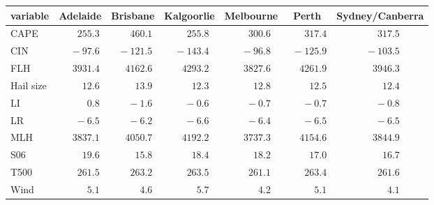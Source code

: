 \begin{tabular}{lcccccc}
\hline
variable  & Adelaide & Brisbane & Kalgoorlie & Melbourne & Perth & \multicolumn{1}{c}{Sydney/Canberra} \\ 
\hline
CAPE  & $\phantom{0}\phantom{-}255.3$ & $\phantom{0}\phantom{-}460.1$ & $\phantom{0}\phantom{-}255.8$ & $\phantom{0}\phantom{-}300.6$ & $\phantom{0}\phantom{-}317.4$ & $\phantom{0}\phantom{-}317.5$ \\
CIN  & $\phantom{00}-97.6$ & $\phantom{0}-121.5$ & $\phantom{0}-143.4$ & $\phantom{00}-96.8$ & $\phantom{0}-125.9$ & $\phantom{0}-103.5$ \\
FLH  & $\phantom{-}3931.4$ & $\phantom{-}4162.6$ & $\phantom{-}4293.2$ & $\phantom{-}3827.6$ & $\phantom{-}4261.9$ & $\phantom{-}3946.3$ \\
Hail size  & $\phantom{00}\phantom{-}12.6$ & $\phantom{00}\phantom{-}13.9$ & $\phantom{00}\phantom{-}12.3$ & $\phantom{00}\phantom{-}12.8$ & $\phantom{00}\phantom{-}12.5$ & $\phantom{00}\phantom{-}12.4$ \\
LI  & $\phantom{000}\phantom{-}0.8$ & $\phantom{000}-1.6$ & $\phantom{000}-0.6$ & $\phantom{000}-0.7$ & $\phantom{000}-0.7$ & $\phantom{000}-0.8$ \\
LR  & $\phantom{000}-6.5$ & $\phantom{000}-6.2$ & $\phantom{000}-6.6$ & $\phantom{000}-6.4$ & $\phantom{000}-6.5$ & $\phantom{000}-6.5$ \\
MLH  & $\phantom{-}3837.1$ & $\phantom{-}4050.7$ & $\phantom{-}4192.2$ & $\phantom{-}3737.3$ & $\phantom{-}4154.6$ & $\phantom{-}3844.9$ \\
S06  & $\phantom{00}\phantom{-}19.6$ & $\phantom{00}\phantom{-}15.8$ & $\phantom{00}\phantom{-}18.4$ & $\phantom{00}\phantom{-}18.2$ & $\phantom{00}\phantom{-}17.0$ & $\phantom{00}\phantom{-}16.7$ \\
T500  & $\phantom{0}\phantom{-}261.5$ & $\phantom{0}\phantom{-}263.2$ & $\phantom{0}\phantom{-}263.5$ & $\phantom{0}\phantom{-}261.1$ & $\phantom{0}\phantom{-}263.4$ & $\phantom{0}\phantom{-}261.6$ \\
Wind  & $\phantom{000}\phantom{-}5.1$ & $\phantom{000}\phantom{-}4.6$ & $\phantom{000}\phantom{-}5.7$ & $\phantom{000}\phantom{-}4.2$ & $\phantom{000}\phantom{-}5.1$ & $\phantom{000}\phantom{-}4.1$ \\
\hline 
\end{tabular}
